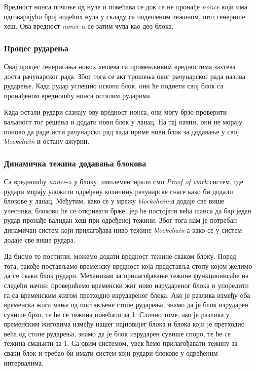 \documentclass[12pt, a4paper]{article}
\begin{document}
Вредност нонса почиње од нуле и повећава се док се не пронађе \textit{nonce} који има одговарајући број водећих нула у складу са подешеном тежином, што генерише хеш. Ова вредност \textit{nonce}-a се затим чува као део блока.

\subsubsection{Процес рударења}
Овај процес генерисања нових хешева са променљивим вредностима захтева доста рачунарског рада. Због тога се акт трошења овог рачунарског рада назива рударење. Када рудар успешно ископа блок, они ће поднети свој блок са пронађеном вредношћу нонса осталим рударима.

Када остали рудари сазнају ову вредност нонса, они могу брзо проверити ваљаност тог решења и додати нови блок у ланац. На тај начин, они не морају поново да раде исти рачунарски рад када приме нови блок за додавање у свој \textit{blockchain} и остану ажурни.

\subsubsection{Динамичка тежина додавања блокова}
Са вредношћу \textit{nonce}-a у блоку, имплементирали смо \textit{Proof of work} систем, где рудари морају уложити одређену количину рачунарске снаге како би додали блокове у ланац. Међутим, како се у мрежу \textit{blockchain}-а додаје све више учесника, блокови ће се откривати брже, јер ће постојати већа шанса да бар један рудар пронађе валидан хеш при одређеној тежини. Због тога нам је потребан динамичан систем који прилагођава ниво тежине \textit{blockchain}-а како се у систем додаје све више рудара.

Да бисмо то постигли, можемо додати вредност тежине сваком блоку. Поред тога, такође постављамо временску вредност која представља стопу којом желимо да се сваки блок рудари. Механизам за прилагођавање тежине функционисаће на следећи начин: проверићемо временски жиг ново изрудареног блока и упоредити га са временским жигом претходно изрудареног блока. Ако је разлика између оба временска жига мања од постављене стопе рударења, знамо да је блок изрударен сувише брзо, те ће се тежина повећати за 1. Слично томе, ако је разлика у временским жиговима између нашег најновијег блока и блока који је претходио већа од стопе рударења, знамо да је блок изрударен сувише споро, те ће се тежина смањити за 1. Са овим системом, увек ћемо прилагођавати тежину за сваки блок и требао би имати систем који рудари блокове у одређеним интервалима.
\end{document}
